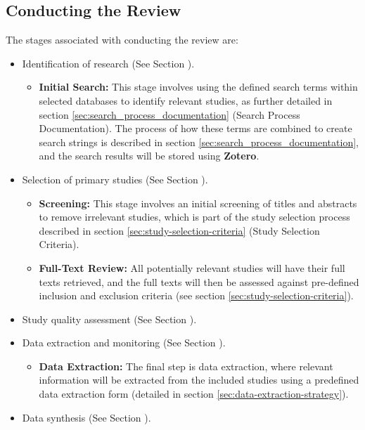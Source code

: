 \subsection{Conducting the Review}
The stages associated with conducting the review are:
\begin{itemize}
	\item Identification of research (See Section ).
	      \begin{itemize}
		      \item \textbf{Initial Search:} This stage involves using the defined search terms within selected
		            databases to identify relevant studies, as further detailed in section \ref{sec:search_process_documentation} (Search Process Documentation). The process of how these terms are combined to create search
		            strings is described in section \ref{sec:search_process_documentation}, and the search results will be stored using \textbf{Zotero}.
	      \end{itemize}
	\item Selection of primary studies (See Section ).
	      \begin{itemize}
		      \item \textbf{Screening:} This stage involves an initial screening of titles and abstracts to remove
		            irrelevant studies, which is part of the study selection process described in section \ref{sec:study-selection-criteria} (Study Selection Criteria).
		      \item \textbf{Full-Text Review:} All potentially relevant studies will have their full texts retrieved,
		            and the full texts will then be assessed against pre-defined inclusion and exclusion criteria (see section \ref{sec:study-selection-criteria}).
	      \end{itemize}
	\item Study quality assessment (See Section ).
	\item Data extraction and monitoring (See Section ).
	      \begin{itemize}
		      \item \textbf{Data Extraction:} The final step is data extraction, where relevant information will be
		            extracted from the included studies using a predefined data extraction form (detailed in section \ref{sec:data-extraction-strategy}).
	      \end{itemize}
	\item Data synthesis (See Section ).
\end{itemize}

